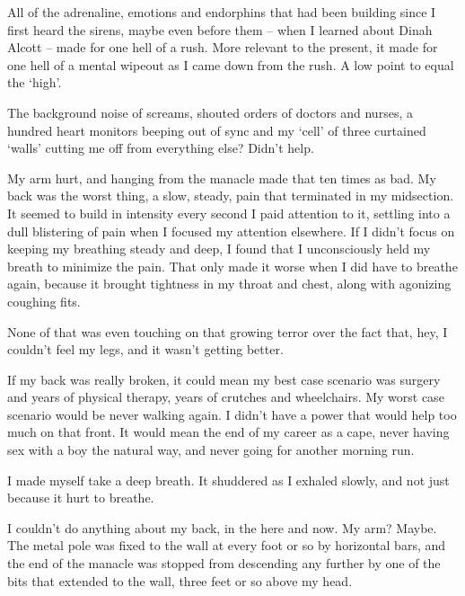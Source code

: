 





All of the adrenaline, emotions and endorphins that had been building since I first heard the sirens, maybe even before them – when I learned about Dinah Alcott – made for one hell of a rush.  More relevant to the present, it made for one hell of a mental wipeout as I came down from the rush.  A low point to equal the `high'.



The background noise of screams, shouted orders of doctors and nurses, a hundred heart monitors beeping out of sync and my `cell' of three curtained `walls' cutting me off from everything else?   Didn't help.



My arm hurt, and hanging from the manacle made that ten times as bad.  My back was the worst thing, a slow, steady, pain that terminated in my midsection. It seemed to build in intensity every second I paid attention to it, settling into a dull blistering of pain when I focused my attention elsewhere.  If I didn't focus on keeping my breathing steady and deep, I found that I unconsciously held my breath to minimize the pain.  That only made it worse when I did have to breathe again, because it brought tightness in my throat and chest, along with agonizing coughing fits.



None of that was even touching on that growing terror over the fact that, hey, I couldn't feel my legs, and it wasn't getting better.



If my back was really broken, it could mean my best case scenario was surgery and years of physical therapy, years of crutches and wheelchairs.  My worst case scenario would be never walking again.  I didn't have a power that would help too much on that front.  It would mean the end of my career as a cape, never having sex with a boy the natural way, and never going for another morning run.



I made myself take a deep breath.  It shuddered as I exhaled slowly, and not just because it hurt to breathe.



I couldn't do anything about my back, in the here and now.  My arm?  Maybe.  The metal pole was fixed to the wall at every foot or so by horizontal bars, and the end of the manacle was stopped from descending any further by one of the bits that extended to the wall, three feet or so above my head.




